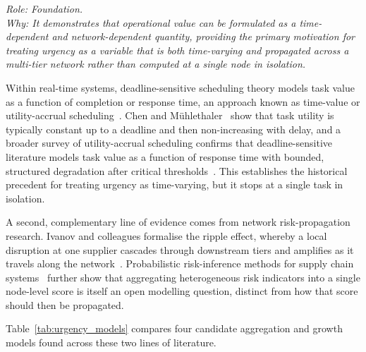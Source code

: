 \noindent\textit{Role: Foundation. \\ Why: It demonstrates that operational value can be formulated as a time-dependent and network-dependent quantity, providing the primary motivation for treating urgency as a variable that is both time-varying and propagated across a multi-tier network rather than computed at a single node in isolation.}

\medskip

Within real-time systems, deadline-sensitive scheduling theory models task value as a function of completion or response time, an approach known as time-value or utility-accrual scheduling~\autocite{cheng1996due,cheng2025survey}. Chen and M\"uhlethaler~\autocite{cheng1996due} show that task utility is typically constant up to a deadline and then non-increasing with delay, and a broader survey of utility-accrual scheduling confirms that deadline-sensitive literature models task value as a function of response time with bounded, structured degradation after critical thresholds~\autocite{cheng2025survey}. This establishes the historical precedent for treating urgency as time-varying, but it stops at a single task in isolation.

A second, complementary line of evidence comes from network risk-propagation research. Ivanov and colleagues formalise the ripple effect, whereby a local disruption at one supplier cascades through downstream tiers and amplifies as it travels along the network~\autocite{ivanov2020digital,ivanov2019viable,li2020exploring}. Probabilistic risk-inference methods for supply chain systems~\autocite{Zhe20} further show that aggregating heterogeneous risk indicators into a single node-level score is itself an open modelling question, distinct from how that score should then be propagated.

Table~\ref{tab:urgency_models} compares four candidate aggregation and growth models found across these two lines of literature.

